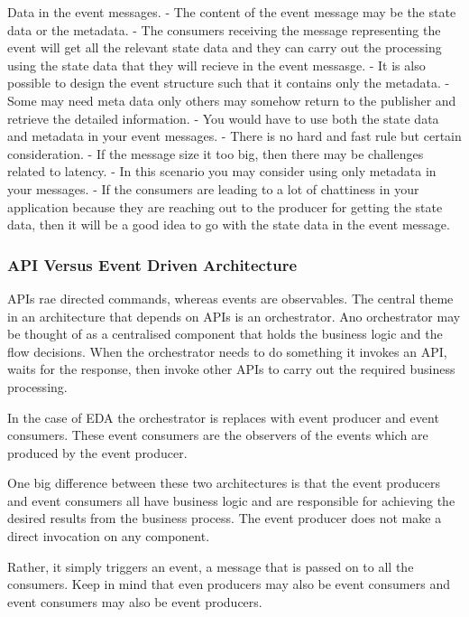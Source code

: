 \documentclass[a4paper, 11pt]{book}
\begin{document}
    Data in the event messages.
    - The content of the event message may be the state data or the metadata.
    - The consumers receiving the message representing the event will get all the relevant state data and they can carry out the processing using the state data that they will recieve in the event messasge.
    - It is also possible to design the event structure such that it contains only the metadata.
    - Some may need meta data only others may somehow return to the publisher and retrieve the detailed information.
    - You would have to use both the state data and metadata in your event messages.
    - There is no hard and fast rule but certain consideration.
    - If the message size it too big, then there may be challenges related to latency.
    - In this scenario you may consider using only metadata in your messages.
    - If the consumers are leading to a lot of chattiness in your application because they are reaching out to the producer for getting the state data, then it will be a good idea to go with the state data in the event message.

    \subsubsection{API Versus Event Driven Architecture}
    APIs rae directed commands, whereas events are observables.
    The central theme in an architecture that depends on APIs is an orchestrator.
    Ano orchestrator may be thought of as a centralised component that holds the business logic and the flow decisions.
    When the orchestrator needs to do something it invokes an API, waits for the response, then invoke other APIs to carry out the required business processing.

    In the case of EDA the orchestrator is replaces with event producer and event consumers.
    These event consumers are the observers of the events which are produced by the event producer.

    One big difference between these two architectures is that the event producers and event consumers all have business logic and are responsible for achieving the desired results from the business process.
    The event producer does not make a direct invocation on any component.

    Rather, it simply triggers an event, a message that is passed on to all the consumers.
    Keep in mind that even producers may also be event consumers and event consumers may also be event producers.
\end{document}
